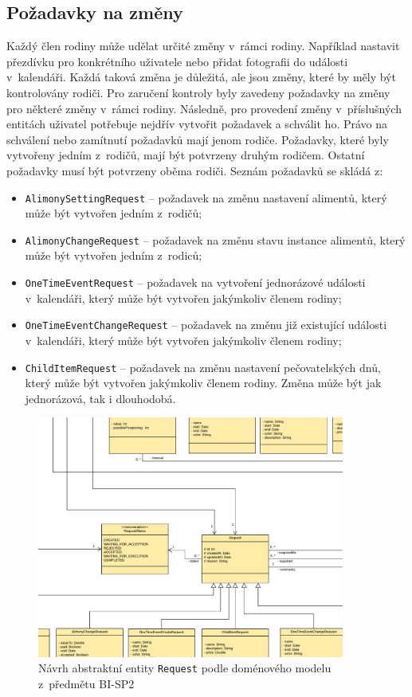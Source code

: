     \subsection{Požadavky na změny}
        Každý člen rodiny může udělat určité změny v~rámci rodiny. Například nastavit přezdívku pro konkrétního uživatele nebo přidat fotografii do události v~kalendáři. Každá taková změna je důležitá, ale jsou změny, které by měly být kontrolovány rodiči. Pro zaručení kontroly byly zavedeny požadavky na změny pro některé změny v~rámci rodiny. Následně, pro provedení změny v~příslušných entitách uživatel potřebuje nejdřív vytvořit požadavek a schválit ho.
        Právo na schválení nebo zamítnutí požadavků mají jenom rodiče. Požadavky, které byly vytvořeny jedním z~rodičů, mají být potvrzeny druhým rodičem. Ostatní požadavky musí být potvrzeny oběma rodiči. Seznám požadavků se skládá z:
        \begin{itemize}
            \setlength\itemsep{0.3em}
            \item \texttt{AlimonySettingRequest} -- požadavek na změnu nastavení alimentů, který může být vytvořen jedním z~rodičů;
            \item \texttt{AlimonyChangeRequest} -- požadavek na změnu stavu instance alimentů, který může být vytvořen jedním z~rodiců;
            \item \texttt{OneTimeEventRequest} -- požadavek na vytvoření jednorázové události v~kalendáři, který může být vytvořen jakýmkoliv členem rodiny;
            \item \texttt{OneTimeEventChangeRequest} -- požadavek na změnu již existující události v~kalendáři, který může být vytvořen jakýmkoliv členem rodiny;
            \item \texttt{ChildItemRequest} -- požadavek na změnu nastavení pečovatelských dnů, který může být vytvořen jakýmkoliv členem rodiny. Změna může být jak jednorázová, tak i dlouhodobá.
        \end{itemize}
        \begin{figure}\centering
	        \includegraphics[width=0.9\textwidth]{pdfs/Abstr-Requrest1}
	        \caption[Návrh abstraktní entity \texttt{Request}]{Návrh abstraktní entity \texttt{Request} podle doménového modelu z~předmětu BI-SP2}\label{image:abstr-request1}
        \end{figure}
